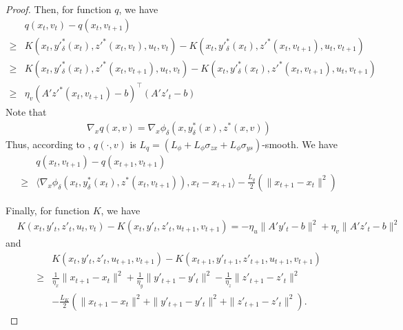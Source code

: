 \documentclass{article}
\theoremstyle{plain}
\theoremstyle{definition}
\theoremstyle{remark}
\begin{document}
\begin{proof}
Then, for function $q$, we have
\begin{align*}
    &q(x_t,v_t)-q(x_t, v_{t+1})\\
    \geq&K(x_t, y'^*_\delta(x_t), z'^*(x_t, v_t), u_t, v_t)-K(x_t, y'^*_\delta(x_t), z'^*(x_t, v_{t+1}), u_t, v_{t+1})\\
    \geq&K(x_t, y'^*_\delta(x_t), z'^*(x_t, v_{t+1}), u_t, v_t)-K(x_t, y'^*_\delta(x_t), z'^*(x_t, v_{t+1}), u_t, v_{t+1})\\
    \geq&\eta_v(A'z'^*(x_t,v_{t+1})-b)^\top(A'z'_t-b)
\end{align*}
Note that
\begin{align*}
    \nabla_x q(x,v)=\nabla_x \phi_\delta(x, y^*_\delta(x), z^*(x,v))
\end{align*}
Thus, according to , $q(\cdot,v)$ is $L_q=(L_\phi+L_\phi\sigma_{zx}+L_\phi\sigma_{ys})$-smooth. We have
\begin{align*}
    &q(x_t,v_{t+1})-q(x_{t+1}, v_{t+1})\\
    \geq&\langle\nabla_x \phi_\delta(x_t, y_\delta^*(x_t), z^*(x_t, v_{t+1})), x_t-x_{t+1}\rangle-\frac{L_q}{2}(\|x_{t+1}-x_t\|^2)
\end{align*}

Finally, for function $K$, we have
\begin{align*}
    &K(x_t, y'_t, z'_t, u_t, v_t)-K(x_t, y'_t, z'_t, u_{t+1}, v_{t+1})=-\eta_u\|A'y'_t-b\|^2+\eta_v\|A'z'_t-b\|^2
\end{align*}
and
\begin{align*}
    &K(x_t, y'_t, z'_t, u_{t+1}, v_{t+1})-K(x_{t+1}, y'_{t+1}, z'_{t+1}, u_{t+1}, v_{t+1})\\
    \geq& \frac{1}{\eta_x}\|x_{t+1}-x_t\|^2+\frac{1}{\eta_y}\|y'_{t+1}-y'_t\|^2-\frac{1}{\eta_z}\|z'_{t+1}-z'_t\|^2\\
    &-\frac{L_K}{2}(\|x_{t+1}-x_t\|^2+\|y'_{t+1}-y'_t\|^2+\|z'_{t+1}-z'_t\|^2).
\end{align*}



\end{proof}
\end{document}
